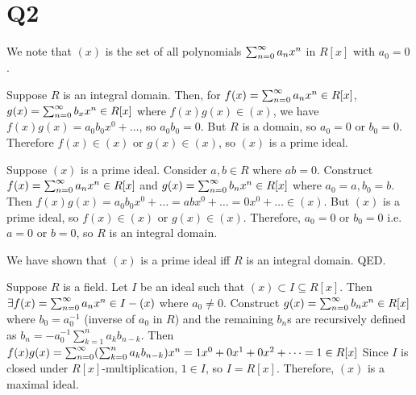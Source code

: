 \documentclass[]{article}
\begin{document}
\section*{Q2}
	We note that $(x)$ is the set of all polynomials $\sum_{n = 0}^{\infty} a_nx^n$ in $R[x]$ with $a_0 = 0$.\newline\newline
	
	Suppose $R$ is an integral domain.\newline
	Then, for $f(x) = \sum_{n = 0}^{\infty} a_nx^n \in R[x]$, $g(x) = \sum_{n = 0}^{\infty} b_xx^n \in R[x]$ where $f(x)g(x) \in (x)$, we have $f(x)g(x) = a_0b_0x^0 + \dots$, so $a_0b_0 = 0$.\newline
	But $R$ is a domain, so $a_0 = 0$ or $b_0 = 0$.\newline
	Therefore $f(x) \in (x)$ or $g(x) \in (x)$, so $(x)$ is a prime ideal.\newline\newline
	
	Suppose $(x)$ is a prime ideal.\newline
	Consider $a,b \in R$ where $ab = 0$.\newline
	Construct $f(x) = \sum_{n = 0}^{\infty} a_nx^n \in R[x]$ and $g(x) = \sum_{n = 0}^{\infty} b_nx^n \in R[x]$ where $a_0 = a, b_0 = b$.\newline
	Then $f(x)g(x) = a_0b_0x^0 + \dots = abx^0 + \dots = 0x^0 + \dots \in (x)$.\newline
	But $(x)$ is a prime ideal, so $f(x) \in (x)$ or $g(x) \in (x)$.\newline
	Therefore, $a_0 = 0$ or $b_0 = 0$ i.e. $a = 0$ or $b = 0$, so $R$ is an integral domain.\newline\newline
	
	We have shown that $(x)$ is a prime ideal iff $R$ is an integral domain. QED.\newline\newline
	
	Suppose $R$ is a field. Let $I$ be an ideal such that $(x) \subset I \subseteq R[x]$.\newline
	Then $\exists f(x) = \sum_{n = 0}^{\infty} a_nx^n \in I-(x)$ where $a_0 \not= 0$.\newline
	Construct $g(x) = \sum_{n = 0}^{\infty} b_nx^n \in R[x]$ where $b_0 = a_0^{-1}$ (inverse of $a_0$ in $R$) and the remaining $b_n$s are recursively defined as $b_n = -a_0^{-1} \sum_{k=1}^{n} a_kb_{n-k}$.\newline
	Then $f(x)g(x) = \sum_{n = 0}^{\infty} (\sum_{k=0}^{n} a_kb_{n-k})x^n = 1x^0 + 0x^1 + 0x^2 + \dots = 1 \in R[x]$\newline
	Since $I$ is closed under $R[x]$-multiplication, $1 \in I$, so $I = R[x]$.\newline
	Therefore, $(x)$ is a maximal ideal.\newline\newline
	
\end{document}

